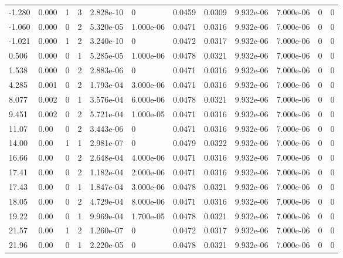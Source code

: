 \documentclass[preview]{standalone}
\begin{document}
{{\begin{tabular}{L{1.2cm}C{1.2cm} C{0.3cm}C{0.5cm} C{1.4cm}C{1.4cm} C{1.4cm}C{1.4cm} C{1.6cm}C{1.6cm} C{1.6cm}C{1.6cm}}
  -1.280  &  0.000  & 1     &  3 &  2.828e-10  & 0  &  0.0459&   0.0309& 9.932e-06 & 7.000e-06   &  0 & 0  \\ 
  -1.060  &  0.000  & 0     &  2 &  5.320e-05  & 1.000e-06  &  0.0471&   0.0316& 9.932e-06 & 7.000e-06   &  0 & 0  \\ 
  -1.021  &  0.000  & 1     &  2 &  3.240e-10  & 0  &  0.0472&   0.0317& 9.932e-06 & 7.000e-06   &  0 & 0  \\ 
  0.506  &  0.000  & 0     &  1 &  5.285e-05  & 1.000e-06  &  0.0478&   0.0321& 9.932e-06 & 7.000e-06   &  0 & 0  \\ 
  1.538  &  0.000  & 0     &  2 &  2.883e-06  & 0  &  0.0471&   0.0316& 9.932e-06 & 7.000e-06   &  0 & 0  \\ 
  4.285  &  0.001  & 0     &  2 &  1.793e-04  & 3.000e-06  &  0.0471&   0.0316& 9.932e-06 & 7.000e-06   &  0 & 0  \\ 
  8.077  &  0.002  & 0     &  1 &  3.576e-04  & 6.000e-06  &  0.0478&   0.0321& 9.932e-06 & 7.000e-06   &  0 & 0  \\ 
  9.451  &  0.002  & 0     &  2 &  5.721e-04  & 1.000e-05  &  0.0471&   0.0316& 9.932e-06 & 7.000e-06   &  0 & 0  \\ 
  11.07  &  0.00  & 0     &  2 &  3.443e-06  & 0  &  0.0471&   0.0316& 9.932e-06 & 7.000e-06   &  0 & 0  \\ 
  14.00  &  0.00  & 1     &  1 &  2.981e-07  & 0  &  0.0479&   0.0322& 9.932e-06 & 7.000e-06   &  0 & 0  \\ 
  16.66  &  0.00  & 0     &  2 &  2.648e-04  & 4.000e-06  &  0.0471&   0.0316& 9.932e-06 & 7.000e-06   &  0 & 0  \\ 
  17.41  &  0.00  & 0     &  2 &  1.182e-04  & 2.000e-06  &  0.0471&   0.0316& 9.932e-06 & 7.000e-06   &  0 & 0  \\ 
  17.43  &  0.00  & 0     &  1 &  1.847e-04  & 3.000e-06  &  0.0478&   0.0321& 9.932e-06 & 7.000e-06   &  0 & 0  \\ 
  18.05  &  0.00  & 0     &  2 &  4.729e-04  & 8.000e-06  &  0.0471&   0.0316& 9.932e-06 & 7.000e-06   &  0 & 0  \\ 
  19.22  &  0.00  & 0     &  1 &  9.969e-04  & 1.700e-05  &  0.0478&   0.0321& 9.932e-06 & 7.000e-06   &  0 & 0  \\ 
  21.57  &  0.00  & 1     &  2 &  1.260e-07  & 0  &  0.0472&   0.0317& 9.932e-06 & 7.000e-06   &  0 & 0  \\ 
  21.96  &  0.00  & 0     &  1 &  2.220e-05  & 0  &  0.0478&   0.0321& 9.932e-06 & 7.000e-06   &  0 & 0  \\ 

\end{tabular}}}
\end{document}
